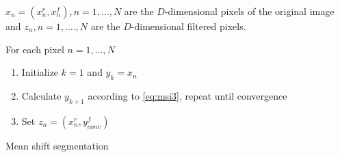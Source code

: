 \begin{algorithm2e}[H]
  $x_n = (x_n^r, x_n^f), n = 1, \ldots , N$ are the $D$-dimensional pixels of the
  original image and $z_n, n = 1 , \ldots. , N$ are the $D$-dimensional filtered pixels.

  For each pixel $n = 1, \ldots , N$
\begin{enumerate}%
    \item Initialize $k = 1$ and $y_k = x_n$
    \item Calculate $y_{k+1}$ according to \autoref{eq:msi3}, repeat until convergence
    \item Set $z_n = (x_n^r, y_{conv}^f)$ 
\end{enumerate}
\label{alg:segmalgo}
\caption{Mean shift segmentation}
\end{algorithm2e}

